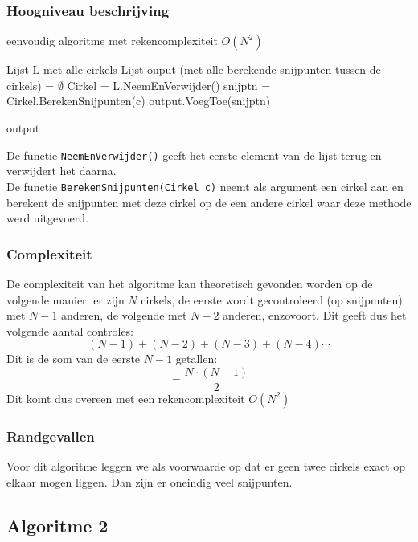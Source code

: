 \documentclass[11pt,a4paper]{article}
\begin{document}
\subsubsection{Hoogniveau beschrijving}
\begin{algorithm}
\caption{eenvoudig algoritme met rekencomplexiteit $O(N^2)$}
\begin{algorithmic}
\State Lijst L met alle cirkels
\State Lijst ouput (met alle berekende snijpunten tussen de cirkels) = $\emptyset$
\State Cirkel = L.NeemEnVerwijder()
\State snijptn = Cirkel.BerekenSnijpunten(c)
\State output.VoegToe(snijptn)
\EndFor
\EndWhile

\Return output
\end{algorithmic}
\end{algorithm}
De functie \verb|NeemEnVerwijder()| geeft het eerste element van de lijst terug en verwijdert het daarna.\\
De functie \verb|BerekenSnijpunten(Cirkel c)| neemt als argument een cirkel aan en berekent de snijpunten met deze cirkel op de een andere cirkel waar deze methode werd uitgevoerd.

\subsubsection{Complexiteit}
De complexiteit van het algoritme kan theoretisch gevonden worden op de volgende manier: er zijn $N$ cirkels, de eerste wordt gecontroleerd (op snijpunten) met $N-1$ anderen, de volgende met $N-2$ anderen, enzovoort. Dit geeft dus het volgende aantal controles:
$$(N-1) + (N-2) + (N-3) + (N - 4) \cdots $$
Dit is de som van de eerste $N-1$ getallen:
$$ = \frac{N\cdot (N-1)}{2} $$
Dit komt dus overeen met een rekencomplexiteit $O(N^2)$
\subsubsection{Randgevallen}
Voor dit algoritme leggen we als voorwaarde op dat er geen twee cirkels exact op elkaar mogen liggen. Dan zijn er oneindig veel snijpunten.

\subsection{Algoritme 2}
\end{document}
